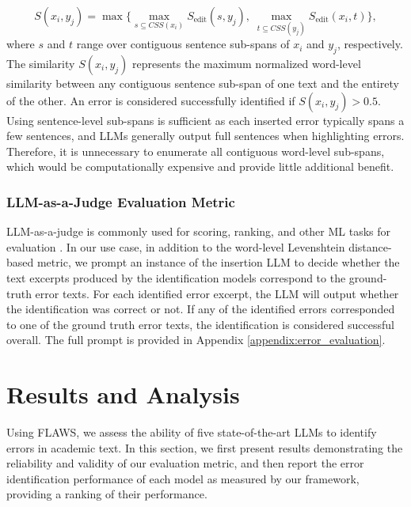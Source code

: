 \documentclass{article}
\newcommand{\benchmark}{FLAWS}
\begin{document}
\[
S(x_i, y_j) = \max \Biggl\{
\max_{s \subseteq CSS(x_i)} S_{\mathrm{edit}}(s, y_j),\;
\max_{t \subseteq CSS(y_j)} S_{\mathrm{edit}}(x_i, t)
\Biggr\},
\]
where $s$ and $t$ range over contiguous sentence sub-spans of $x_i$ and $y_j$, respectively. The similarity $S(x_i, y_j)$ represents the maximum normalized word-level similarity between any contiguous sentence sub-span of one text and the entirety of the other. An error is considered successfully identified if $S(x_i, y_j) > 0.5$. Using sentence-level sub-spans is sufficient as each inserted error typically spans a few sentences, and LLMs generally output full sentences when highlighting errors. Therefore, it is unnecessary to enumerate all contiguous word-level sub-spans, which would be computationally expensive and provide little additional benefit. 

\subsubsection{LLM-as-a-Judge Evaluation Metric}
LLM-as-a-judge is commonly used for scoring, ranking, and other ML tasks for evaluation \citep{li2025llm}. In our use case, in addition to the word-level Levenshtein distance-based metric, we prompt an instance of the insertion LLM to decide whether the text excerpts produced by the identification models correspond to the ground-truth error texts. For each identified error excerpt, the LLM will output whether the identification was correct or not. If any of the identified errors corresponded to one of the ground truth error texts, the identification is considered successful overall. The full prompt is provided in Appendix \ref{appendix:error_evaluation}. 



\section{Results and Analysis}
\label{section:results}


Using \benchmark{}, we assess the ability of five state-of-the-art LLMs to identify errors in academic text. In this section, we first present results demonstrating the reliability and validity of our evaluation metric, and then report the error identification performance of each model as measured by our framework, providing a ranking of their performance.
\end{document}
